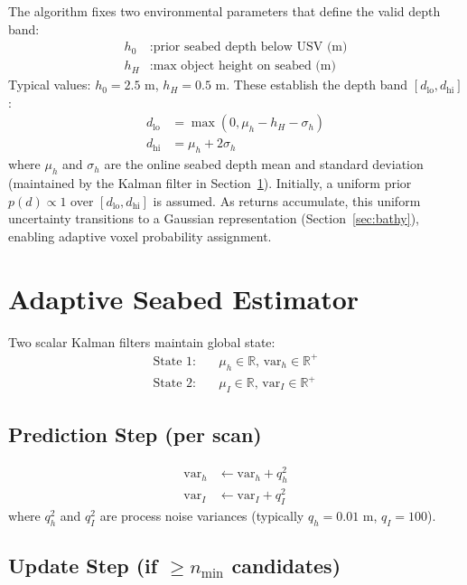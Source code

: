 \documentclass[10pt,twocolumn]{article}
\begin{document}
The algorithm fixes two environmental parameters that define the valid depth band:
\begin{align}
h_0 &: \text{prior seabed depth below USV (m)} \\
h_H &: \text{max object height on seabed (m)}
\end{align}
Typical values: $h_0 = 2.5$ m, $h_H = 0.5$ m. These establish the depth band $[d_{\text{lo}}, d_{\text{hi}}]$:
\begin{align}
d_{\text{lo}} &= \max(0, \mu_h - h_H - \sigma_h) \label{eq:band_lo}\\
d_{\text{hi}} &= \mu_h + 2\sigma_h \label{eq:band_hi}
\end{align}
where $\mu_h$ and $\sigma_h$ are the online seabed depth mean and standard deviation (maintained by the Kalman filter in Section~\ref{sec:adaptive}). Initially, a uniform prior $p(d) \propto 1$ over $[d_{\text{lo}}, d_{\text{hi}}]$ is assumed. As returns accumulate, this uniform uncertainty transitions to a Gaussian representation (Section~\ref{sec:bathy}), enabling adaptive voxel probability assignment.

\section{Adaptive Seabed Estimator} \label{sec:adaptive}

Two scalar Kalman filters maintain global state:
\begin{align}
\text{State 1:} \quad &\mu_h \in \mathbb{R}, \, \text{var}_h \in \mathbb{R}^+ \\
\text{State 2:} \quad &\mu_I \in \mathbb{R}, \, \text{var}_I \in \mathbb{R}^+
\end{align}

\subsection{Prediction Step (per scan)}
\begin{align}
\text{var}_h &\leftarrow \text{var}_h + q_h^2 \label{eq:pred_var_h} \\
\text{var}_I &\leftarrow \text{var}_I + q_I^2
\end{align}
where $q_h^2$ and $q_I^2$ are process noise variances (typically $q_h = 0.01$ m, $q_I = 100$).

\subsection{Update Step (if $\geq n_{\min}$ candidates)}
\end{document}

